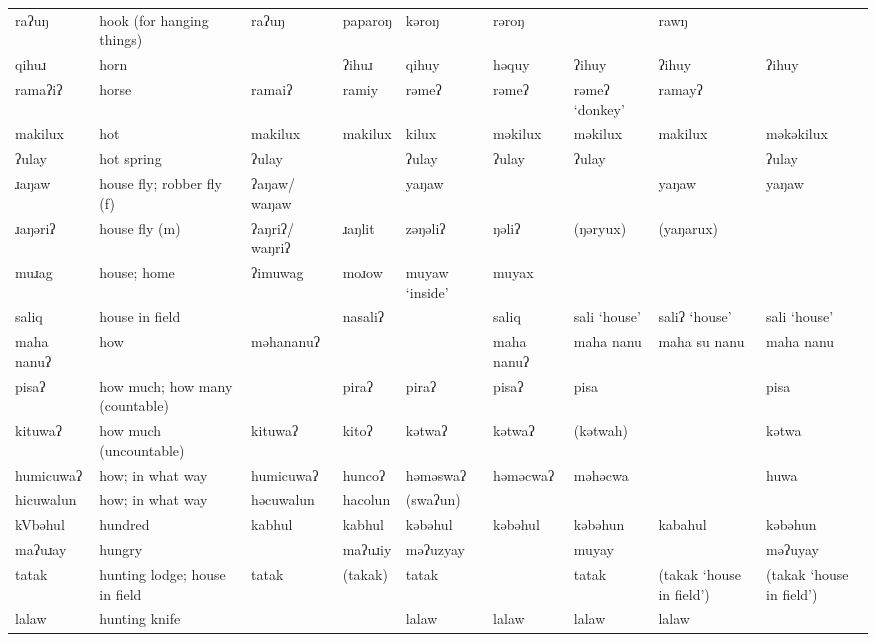 \begin{landscape}
\begin{longtable}{*{9}{>{\raggedright\arraybackslash}p{}}}
\text{*}raʔuŋ       & hook (for hanging things) & raʔuŋ & paparoŋ & kəroŋ & rəroŋ &  & rawŋ & \\
\text{*}qihuɹ        & horn &  & ʔihuɹ & qihuy & həquy & ʔihuy & ʔihuy & ʔihuy\\
\text{*}ramaʔiʔ      & horse & ramaiʔ & ramiy & rəmeʔ & rəmeʔ & rəmeʔ \newline `donkey' & ramayʔ & \\
\text{*}makilux      & hot & makilux & makilux & kilux & məkilux & məkilux & makilux & məkəkilux\\
\text{*}ʔulay        & hot spring & ʔulay &  & ʔulay & ʔulay & ʔulay &  & ʔulay\\
\text{*}ɹaŋaw        & house fly; robber fly (f) & ʔaŋaw/ \newline waŋaw &  & yaŋaw &  &  & yaŋaw & yaŋaw\\
\text{*}ɹaŋəriʔ      & house fly (m) & ʔaŋriʔ/ \newline waŋriʔ & ɹaŋlit & zəŋəliʔ & ŋəliʔ & (ŋəryux) & (yaŋarux) & \\
\text{*}muɹag        & house; home & ʔimuwag & moɹow & muyaw \newline `inside' & muyax &  &  & \\
\text{*}saliq        & house in field &  & nasaliʔ &  & saliq & sali `house' & saliʔ `house' & sali `house'\\
\text{*}maha nanuʔ   & how & məhananuʔ &  &  & maha nanuʔ & maha nanu & maha su nanu & maha nanu\\
\text{*}pisaʔ        & how much; how many (countable) &  & piraʔ & piraʔ & pisaʔ & pisa &  & pisa\\
\text{*}kituwaʔ      & how much (uncountable) & kituwaʔ & kitoʔ & kətwaʔ & kətwaʔ & (kətwah) &  & kətwa\\
\text{*}humicuwaʔ    & how; in what way & humicuwaʔ & huncoʔ & həməswaʔ & həməcwaʔ & məhəcwa &  & huwa\\
\text{*}hicuwalun    & how; in what way & həcuwalun & hacolun & (swaʔun) &  &  &  & \\
\text{*}kVbəhul      & hundred & kabhul & kabhul & kəbəhul & kəbəhul & kəbəhun & kabahul & kəbəhun\\
\text{*}maʔuɹay      & hungry &  & maʔuɹiy & məʔuzyay &  & muyay &  & məʔuyay\\
\text{*}tatak        & hunting lodge; house in field & tatak & (takak) & tatak &  & tatak & (takak `house in field') & (takak `house in field')\\
\text{*}lalaw        & hunting knife &  &  & lalaw & lalaw & lalaw & lalaw & \\

\end{longtable}
\end{landscape}
